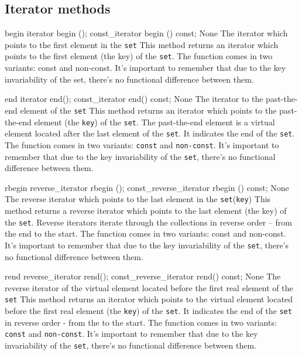 \subsection{Iterator methods} %

\begin{methodinfo}
  {begin}
  {iterator begin (); const_iterator begin () const;}
  {None}
  {The iterator which points to the first element in the \texttt{set}}
  {This method returns an iterator which points to the first element (the key) of the \texttt{set}. 
  The function comes in two variants: const and non-const. It’s important to remember that due to the key 
  invariability of the set, there’s no functional difference between them. }
\end{methodinfo}
\begin{methodinfo}
  {end}
  {iterator end(); const_iterator end() const;}
  {None}
  {The iterator to the past-the-end element of the \texttt{set}}
  {This method returns an iterator which points to the past-the-end element (the \texttt{key}) of 
  the \texttt{set}. The past-the-end element is a virtual element located after the last element 
  of the \texttt{set}. It indicates the end of the \texttt{set}. The function comes in two variants: 
  \texttt{const} and \texttt{non-const}. It’s important to remember that due to the key invariability 
  of the \texttt{set}, there’s no functional difference between them.}
\end{methodinfo}
\begin{methodinfo}
  {rbegin}
  {reverse_iterator rbegin (); const_reverse_iterator rbegin () const;}
  {None}
  {The reverse iterator which points to the last element in the \texttt{set}(\texttt{key})}
  {This method returns a reverse iterator which points to the last element (the key) of the \texttt{set}.
  Reverse iterators iterate through the collections in reverse order – from the end to the start.
  The function comes in two variants: const and non-const. It’s important to remember that due to the key 
  invariability of the \texttt{set}, there’s no functional difference between them. }
\end{methodinfo}
\begin{methodinfo}
  {rend}
  {reverse_iterator rend(); const_reverse_iterator rend() const;}
  {None}
  {The reverse iterator of the virtual element located before the first real element of the \texttt{set}}
  {This method returns an iterator which points to the virtual element located before the first real element
  (the \texttt{key}) of the \texttt{set}. It indicates the end of the \texttt{set} in reverse order - from the 
  to the start. The function comes in two variants: \texttt{const} and \texttt{non-const}. It’s important to 
  remember that due to the key invariability of the \texttt{set}, there’s no functional difference between them.}
\end{methodinfo}

